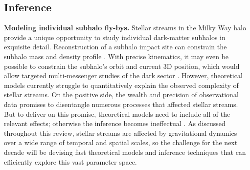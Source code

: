 \documentclass[final,5p,times,twocolumn,authoryear]{elsarticle}
\begin{document}
\subsection{Inference}
\textbf{Modeling individual subhalo fly-bys.}
Stellar streams in the Milky Way halo provide a unique opportunity to study individual dark-matter subhalos in exquisite detail.
Reconstruction of a subhalo impact site can constrain the subhalo mass and density profile \citep{erkal:2015b, bonaca:2019, hilmi:2024}.
With precise kinematics, it may even be possible to constrain the subhalo's orbit and current 3D position, which would allow targeted multi-messenger studies of the dark sector \citep{bonaca:2020, mirabal:2021}.
However, theoretical models currently struggle to quantitatively explain the observed complexity of stellar streams.
On the positive side, the wealth and precision of observational data promises to disentangle numerous processes that affected stellar streams.
But to deliver on this promise, theoretical models need to include all of the relevant effects; otherwise the inference becomes ineffectual \citep[e.g., the power-spectrum of the GD-1 density can be separately reproduced both by internal epicyclic overdensities and external impacts of dark-matter subhalos, molecular clouds and spiral arms, cf.][]{ibata:2020, banik:2021}.
As discussed throughout this review, stellar streams are affected by gravitational dynamics over a wide range of temporal and spatial scales, so the challenge for the next decade will be devising fast theoretical models and inference techniques that can efficiently explore this vast parameter space.
\end{document}

